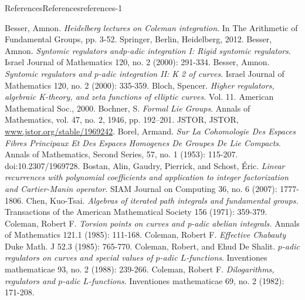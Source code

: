 \documentclass[oneside,10pt,]{book}
\numberwithin{equation}{section}
\begin{document}
\begin{references-chapter-numberless}{References}{}{References}{}{}{references-1}
\begin{thebibliography}{9}
\hypertarget{bib-besser-coleman-heidelberg}{}Besser, Amnon. \textit{Heidelberg lectures on Coleman integration}. In The Arithmetic of Fundamental Groups, pp. 3-52. Springer, Berlin, Heidelberg, 2012.
\hypertarget{bib-besser-syntomic-I}{}Besser, Amnon. \textit{Syntomic regulators andp-adic integration I: Rigid syntomic regulators}. Israel Journal of Mathematics 120, no. 2 (2000): 291-334.
\hypertarget{bib-besser-syntomic-II}{}Besser, Amnon. \textit{Syntomic regulators and \(p\)-adic integration II: K 2 of curves}. Israel Journal of Mathematics 120, no. 2 (2000): 335-359.
\hypertarget{bib-bloch}{}Bloch, Spencer.  \textit{Higher regulators, algebraic K-theory, and zeta functions of elliptic curves.} Vol. 11. American Mathematical Soc., 2000.
\hypertarget{bib-bochner-formal}{}Bochner, S. \textit{Formal Lie Groups}. Annals of Mathematics, vol. 47, no. 2, 1946, pp. 192–201. JSTOR, JSTOR, \url{www.jstor.org/stable/1969242}.
\hypertarget{bib-borel-hopf}{}Borel, Armand. \textit{Sur La Cohomologie Des Espaces Fibres Principaux Et Des Espaces Homogenes De Groupes De Lie Compacts}. Annals of Mathematics, Second Series, 57, no. 1 (1953): 115-207. doi:10.2307/1969728.
\hypertarget{bib-bostan-gaudry-schost}{}Bostan, Alin, Gaudry, Pierrick, and Schost, Éric. \textit{Linear recurrences with polynomial coefficients and application to integer factorization and Cartier-Manin operator}. SIAM Journal on Computing 36, no. 6 (2007): 1777-1806.
\hypertarget{bib-chen}{}Chen, Kuo-Tsai.  \textit{Algebras of iterated path integrals and fundamental groups.} Transactions of the American Mathematical Society 156 (1971): 359-379.
\hypertarget{bib-coleman-torsion}{}Coleman, Robert F.  \textit{Torsion points on curves and p-adic abelian integrals.} Annals of Mathematics 121.1 (1985): 111-168.
\hypertarget{bib-coleman-chabauty}{}Coleman, Robert F.  \textit{Effective Chabauty} Duke Math. J 52.3 (1985): 765-770.
\hypertarget{bib-coleman-de-shalit}{}Coleman, Robert, and Ehud De Shalit. \textit{\(p\)-adic regulators on curves and special values of \(p\)-adic \(L\)-functions}. Inventiones mathematicae 93, no. 2 (1988): 239-266.
\hypertarget{bib-coleman-dilogs}{}Coleman, Robert F. \textit{Dilogarithms, regulators and \(p\)-adic \(L\)-functions}. Inventiones mathematicae 69, no. 2 (1982): 171-208.

\end{thebibliography}
\end{references-chapter-numberless}
\end{document}
